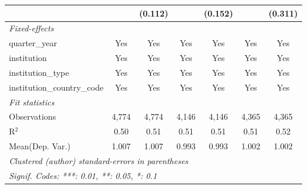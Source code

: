 \begin{tabular}{lcccccc}
                                      &              & (0.112)        &              & (0.152)        &              & (0.311)\\   
   \midrule
   \emph{Fixed-effects}\\
   quarter\_year                      & Yes          & Yes            & Yes          & Yes            & Yes          & Yes\\  
   institution                        & Yes          & Yes            & Yes          & Yes            & Yes          & Yes\\  
   institution\_type                  & Yes          & Yes            & Yes          & Yes            & Yes          & Yes\\  
   institution\_country\_code         & Yes          & Yes            & Yes          & Yes            & Yes          & Yes\\  
   \midrule
   \emph{Fit statistics}\\
   Observations                       & 4,774        & 4,774          & 4,146        & 4,146          & 4,365        & 4,365\\  
   R$^2$                              & 0.50         & 0.51           & 0.51         & 0.51           & 0.51         & 0.52\\  
Mean(Dep. Var.) & 1.007 & 1.007 & 0.993 & 0.993 & 1.002 & 1.002 \\
   \midrule \midrule
   \multicolumn{7}{l}{\emph{Clustered (author) standard-errors in parentheses}}\\
   \multicolumn{7}{l}{\emph{Signif. Codes: ***: 0.01, **: 0.05, *: 0.1}}\\
\end{tabular}
\par\endgroup
